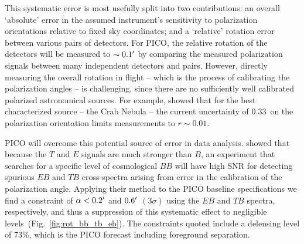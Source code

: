 \documentclass[PICOReport.tex]{subfiles}
\begin{document}
This systematic error is most usefully split into two contributions: an overall `absolute' error in the assumed instrument's sensitivity to polarization orientations relative to fixed sky coordinates; and a `relative' rotation error between various pairs of detectors. For PICO, the relative rotation of the detectors will be measured to $\sim 0.1'$ by comparing the measured polarization signals between many independent detectors and pairs. However, directly measuring the overall rotation in flight -- which is the process of calibrating the polarization angles --  is challenging, since there are no sufficiently well calibrated polarized astronomical sources. For example, \citet{Aumont+2018} showed that for the best characterized source -- the Crab Nebula -- the current uncertainty of $0.33$\degree\ on the polarization orientation limits measurements to $r \sim 0.01$. 

PICO will overcome this potential source of error 
in data analysis. \citet{yadav2010} showed that because the $T$ and $E$ signals are much stronger than $B$, an experiment that searches for a specific level of cosmological $BB$ will have high \ac{SNR} for detecting spurious $EB$ and $TB$ cross-spectra arising from error in the calibration of the polarization angle. Applying their method to the PICO baseline specifications we find a constraint of $\alpha<0.2'$ and $0.6'$ $(3\sigma)$ using the $EB$ and $TB$ spectra, respectively, and thus a suppression of this systematic effect to negligible levels~(Fig.~\ref{fig:rot_bb_tb_eb}). The constraints quoted include a delensing level of 73\%, which is the PICO forecast including foreground separation. 



\end{document}
